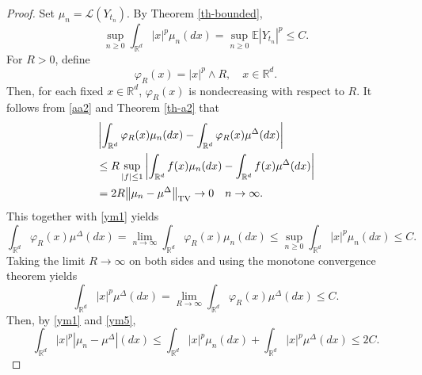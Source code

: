 \documentclass[preprint,12pt,compress]{elsarticle}
\begin{document}
\begin{proof}
Set $\mu_n = \mathcal{L}(Y_{t_n})$. By Theorem \ref{th-bounded},
\begin{equation}  \label{ym1}
	\mathop {\sup }\limits_{n \ge 0} \int_{{\mathbb{R}^d}} {{{\left| x \right|}^p}{\mu _n}(dx)}  = \mathop {\sup }\limits_{n \ge 0} \mathbb{E}{\left| {{Y_{{t_n}}}} \right|^p} \le C.
\end{equation}
For $R > 0$, define 
\begin{equation*}
	{\varphi _R}(x) = {\left| x \right|^p} \wedge R, \quad x \in \mathbb{R}^d.
\end{equation*}
Then, for each fixed $x \in \mathbb{R}^d$, $\varphi_R(x)$ is nondecreasing with respect to $R$. It follows from \eqref{aa2} and Theorem \ref{th-a2} that
\begin{equation*}
\begin{split}
	&\left| {\int_{{\mathbb{R}^d}} {{\varphi _R}(x){\mu _n}(dx)}  - \int_{{\mathbb{R}^d}} {{\varphi _R}(x){\mu ^\Delta }(dx)} } \right|\\
	&\le R\mathop {\sup }\limits_{\left| f \right| \le 1} \left| {\int_{{\mathbb{R}^d}} {f(x){\mu _n}(dx)}  - \int_{{\mathbb{R}^d}} {f(x){\mu ^\Delta }(dx)} } \right|  \\
	&= 2R{\left\| {{\mu _n} - {\mu ^\Delta }} \right\|_{{\rm TV}}} \to 0  \quad n \to \infty.
\end{split}
\end{equation*}
This together with \eqref{ym1} yields
\begin{equation*}
	\int_{{\mathbb{R}^d}} {{\varphi _R}(x){\mu ^\Delta }(dx)}  = \mathop {\lim }\limits_{n \to \infty } \int_{{\mathbb{R}^d}} {{\varphi _R}(x){\mu _n}(dx)} \le \mathop {\sup }\limits_{n \ge 0} \int_{{\mathbb{R}^d}} {{{\left| x \right|}^p}{\mu _n}(dx)} \le C .
\end{equation*}
Taking the limit $R \to \infty$ on both sides and using the monotone convergence theorem yields
\begin{equation}  \label{ym5}
	\int_{{\mathbb{R}^d}} {{{\left| x \right|}^p}{\mu ^\Delta }(dx)}  = \mathop {\lim }\limits_{R \to \infty } \int_{{\mathbb{R}^d}} {{\varphi _R}(x){\mu ^\Delta }(dx)}  \le C.
\end{equation}
Then, by \eqref{ym1} and \eqref{ym5},
\begin{equation}  \label{ym4}
	\int_{{\mathbb{R}^d}} {{{\left| x \right|}^p}\left| {{\mu _n} - {\mu ^\Delta }} \right|(dx)}  \le \int_{{\mathbb{R}^d}} {{{\left| x \right|}^p}{\mu _n}(dx)}  + \int_{{\mathbb{R}^d}} {{{\left| x \right|}^p}{\mu ^\Delta }(dx)}  \le 2C.

\end{equation}
\end{proof}
\end{document}
